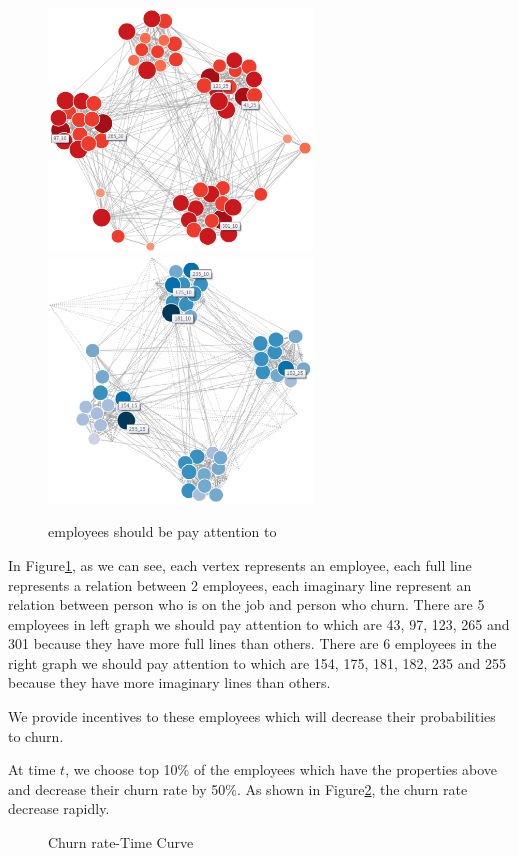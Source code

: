 \documentclass[12pt,a4paper,titlepage]{article}
\begin{document}
\begin{figure}[htb]
  \centering
  \includegraphics[width=7cm]{p1.eps}
  \includegraphics[width=7cm]{p2.eps}
  \caption{employees should be pay attention
    to}\label{incentive-mechanism}
\end{figure}

In Figure\ref{incentive-mechanism}, as we can see, each vertex
represents an employee, each full line represents a relation between 2
employees, each imaginary line represent an relation between person
who is on the job and person who churn. There are 5
employees in left graph we should pay attention to which are
43, 97, 123, 265 and 301 because they have more full lines than
others. There are 6 employees in the right graph we should pay
attention to which are 154, 175, 181, 182, 235 and 255 because they
have more imaginary lines than others.

We provide incentives to these employees which will decrease their
probabilities to churn.

At time $t$, we choose top 10\% of the employees which have the
properties above and decrease their churn rate by 50\%. As shown in
Figure\ref{churn-rate}, the churn rate decrease rapidly.

\begin{figure}[htb]
  \centering
  \caption{Churn rate-Time Curve}
  \label{churn-rate}
\end{figure}
\end{document}
